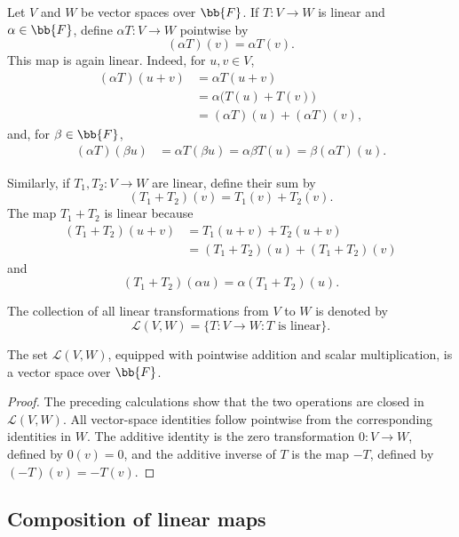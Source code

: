 Let $V$ and $W$ be vector spaces over $\bb{F}$. If
$T\colon V\to W$ is linear and $\alpha\in\bb{F}$, define
$\alpha T\colon V\to W$ pointwise by
\[
  (\alpha T)(v)=\alpha T(v).
\]
This map is again linear. Indeed, for $u,v\in V$,
\begin{align*}
  (\alpha T)(u+v)
  &=\alpha T(u+v) \\
  &=\alpha\bigl(T(u)+T(v)\bigr) \\
  &=(\alpha T)(u)+(\alpha T)(v),
\end{align*}
and, for $\beta\in\bb{F}$,
\begin{align*}
  (\alpha T)(\beta u)
  &=\alpha T(\beta u)
    =\alpha\beta T(u)
    =\beta(\alpha T)(u).
\end{align*}

Similarly, if $T_1,T_2\colon V\to W$ are linear, define their sum by
\[
  (T_1+T_2)(v)=T_1(v)+T_2(v).
\]
The map $T_1+T_2$ is linear because
\begin{align*}
  (T_1+T_2)(u+v)
  &=T_1(u+v)+T_2(u+v) \\
  &=(T_1+T_2)(u)+(T_1+T_2)(v)
\end{align*}
and
\[
  (T_1+T_2)(\alpha u)
  =\alpha(T_1+T_2)(u).
\]

\begin{definition}
  The collection of all linear transformations from $V$ to $W$ is
  denoted by
  \[
    \mathcal L(V,W)
    =\{T\colon V\to W:T\text{ is linear}\}.
  \]
\end{definition}

\begin{proposition}
  The set $\mathcal L(V,W)$, equipped with pointwise addition and scalar
  multiplication, is a vector space over $\bb{F}$.
\end{proposition}

\begin{proof}
  The preceding calculations show that the two operations are closed in
  $\mathcal L(V,W)$. All vector-space identities follow pointwise from
  the corresponding identities in $W$. The additive identity is the
  zero transformation $0\colon V\to W$, defined by $0(v)=0$, and the
  additive inverse of $T$ is the map $-T$, defined by
  $(-T)(v)=-T(v)$.
\end{proof}

\subsection{Composition of linear maps}

